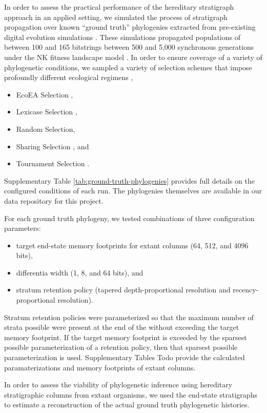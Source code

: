 In order to assess the practical performance of the hereditary stratigraph approach in an applied setting, we simulated the process of stratigraph propagation over known ``ground truth'' phylogenies extracted from pre-existing digital evolution simulations \citep{dolson2018applying}.
These simulations propagated populations of between 100 and 165 bitstrings between 500 and 5,000 synchronous generations under the NK fitness landscape model \citep{kauffman1989nk}.
In order to ensure coverage of a variety of phylogenetic conditions, we sampled a variety of selection schemes that impose profoundly different ecological regimens \citep{dolson2018ecological},
\begin{itemize}
  \item EcoEA Selection \citep{goings2012ecology},
  \item Lexicase Selection \citep{helmuth2014solving},
  \item Random Selection,
  \item Sharing Selection \citep{goldberg1987genetic}, and
  \item Tournament Selection \citep{miller1995genetic}.
\end{itemize}

Supplementary Table \ref{tab:ground-truth-phylogenies} provides full details on the configured conditions of each run.
The phylogenies themselves are available in our data repository for this project.

For each ground truth phylogeny, we tested combinations of three configuration parameters:
\begin{itemize}
  \item target end-state memory footprints for extant columns (64, 512, and 4096 bits),
  \item differentia width (1, 8, and 64 bits), and
  \item stratum retention policy (tapered depth-proportional resolution and recency-proportional resolution).
\end{itemize}

Stratum retention policies were parameterized so that the maximum number of strata possible were present at the end of the without exceeding the target memory footprint.
If the target memory footprint is exceeded by the sparsest possible parameterization of a retention policy, then that sparsest possible parameterization is used.
Supplementary Tables Todo provide the calculated paramaterizations and memory footprints of extant columns.

In order to assess the viability of phylogenetic inference using hereditary stratigraphic columns from extant organisms, we used the end-state stratigraphs to estimate a reconstruction of the actual ground truth phylogenetic histories.

